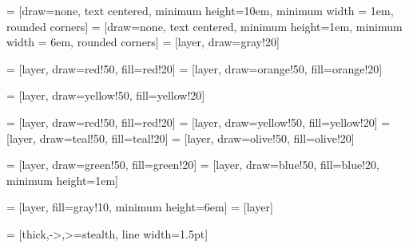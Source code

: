\usetikzlibrary{calc,trees,positioning,arrows,chains,shapes.geometric,%
	decorations.pathreplacing,decorations.pathmorphing,shapes,%
	matrix,shapes.symbols, positioning,fit,calc, angles, quotes, patterns,%
	decorations.text}

\def\blocksx{2.5em}
\def\blocksy{0em}

\def\dimsx{0em}
\def\dimsy{-9em}

\def\layerheight{10em}
\def\layerwidth{1em}  

 = [draw=none, text centered, minimum height=\layerheight,  minimum width = \layerwidth, rounded corners]
 = [draw=none, text centered, minimum height=\layerwidth,  minimum width = 6em, rounded corners]
 = [layer, draw=gray!20]		%

 = [layer, draw=red!50, fill=red!20]		%
 = [layer, draw=orange!50, fill=orange!20]		%

 = [layer, draw=yellow!50, fill=yellow!20]		%

 = [layer, draw=red!50, fill=red!20]
 = [layer, draw=yellow!50, fill=yellow!20]
 = [layer, draw=teal!50, fill=teal!20]
 = [layer, draw=olive!50, fill=olive!20]

 = [layer, draw=green!50, fill=green!20] 		%
 = [layer, draw=blue!50, fill=blue!20, minimum height=1em]

 = [layer, fill=gray!10,  minimum height=6em]
 = [layer]

\newcommand{\rot}[1]{\rotatebox{90}{#1}}

 = [thick,->,>=stealth, line width=1.5pt]